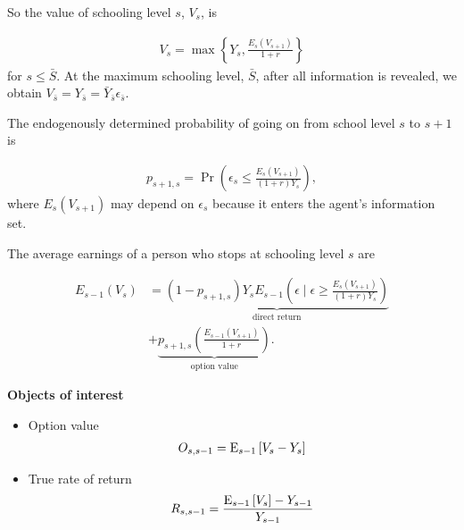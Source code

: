 \begin{frame}
So the value of schooling level $s$, $V_s$, is

\begin{align*}
V_s = \max\left\{Y_s, \frac{E_s(V_{s+1})}{1 + r}\right\}
\end{align*}
for $s \leq \bar{S}$. At the maximum schooling level, $\bar{S}$, after all information is revealed, we obtain $V_{\bar{s}} = Y_{\bar{s}} = \bar{Y}_{\bar{s}}\epsilon_{\bar{s}}$.

\end{frame}
\begin{frame}
The endogenously determined probability of going on from school level $s$ to $s + 1$ is

\begin{align*}
p_{s + 1, s} = \Pr\left(\epsilon_s \leq \frac{E_s(V_{s + 1})}{(1 + r) Y_s}\right),
\end{align*}
where $E_s(V_{s + 1})$ may depend on $\epsilon_s$ because it enters the agent's information set.
\end{frame}
\begin{frame}
The average earnings of a person who stops at schooling level $s$ are

\begin{align*}
E_{s - 1}(V_s) & = \underbrace{(1 - p_{s + 1, s}) Y_s E_{s - 1}\left(\epsilon\mid \epsilon \ge \frac{E_s(V_{s + 1})}{(1 + r)Y_s}\right)}_{\text{direct return}} \\
 & + \underbrace{p_{s + 1, s} \left(\frac{E_{s - 1}(V_{s + 1})}{1 + r}\right)}_{\text{option value}}.
\end{align*}
\end{frame}
\begin{frame}\textbf{Objects of interest}\vspace{0.3cm}

\begin{itemize}
\item Option value
\begin{align*}
O_{s, s - 1} = \mathrm{E}_{s - 1}\left[V_s - Y_s\right]\\
\end{align*}
\item True rate of return
\begin{align*}
R_{s, s - 1} = \frac{\mathrm{E}_{s - 1}\left[V_s\right] - Y_{s - 1}}{Y_{s -1}}
\end{align*}
\end{itemize}
\end{frame}
